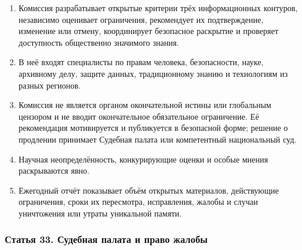 \documentclass[
  russian,
  11pt,
  a4paper,
]{article}
\providecommand{\tightlist}{%
  \setlength{\itemsep}{0pt}\setlength{\parskip}{0pt}}
\begin{document}
\begin{enumerate}
\def\labelenumi{\arabic{enumi}.}
\tightlist
\item
  Комиссия разрабатывает открытые критерии трёх информационных контуров,
  независимо оценивает ограничения, рекомендует их подтверждение,
  изменение или отмену, координирует безопасное раскрытие и проверяет
  доступность общественно значимого знания.
\item
  В неё входят специалисты по правам человека, безопасности, науке,
  архивному делу, защите данных, традиционному знанию и технологиям из
  разных регионов.
\item
  Комиссия не является органом окончательной истины или глобальным
  цензором и не вводит окончательное обязательное ограничение. Её
  рекомендация мотивируется и публикуется в безопасной форме; решение о
  продлении принимает Судебная палата или компетентный национальный суд.
\item
  Научная неопределённость, конкурирующие оценки и особые мнения
  раскрываются явно.
\item
  Ежегодный отчёт показывает объём открытых материалов, действующие
  ограничения, сроки их пересмотра, исправления, жалобы и случаи
  уничтожения или утраты уникальной памяти.
\end{enumerate}

\subsubsection{Статья 33. Судебная палата и право
жалобы}\label{ux441ux442ux430ux442ux44cux44f-33-ux441ux443ux434ux435ux431ux43dux430ux44f-ux43fux430ux43bux430ux442ux430-ux438-ux43fux440ux430ux432ux43e-ux436ux430ux43bux43eux431ux44b}
\end{document}
